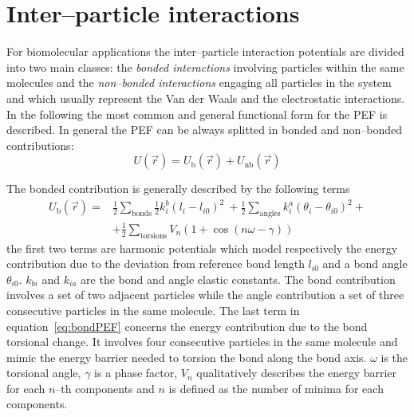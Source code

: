\section{Inter--particle interactions}
For biomolecular applications the inter--particle interaction potentials are divided into two main classes: the
\textit{bonded interactions} involving particles within the same molecules and the \textit{non--bonded
interactions} engaging all particles in the system and which usually represent the Van der Waals and the
electrostatic interactions. In the following the most common and general functional form for the \ac{PEF} is
described. In general the \ac{PEF} can be always splitted in bonded and non--bonded contributions:
\begin{equation*}
	U(\vec r) = U_{\text{b}}(\vec r) + U_\text{nb}(\vec r)
	\label{eq:FFPEF}
\end{equation*}

The bonded contribution is generally described by the following terms
\begin{equation}
	\begin{aligned}
	U_{\text{b}}(\vec r) = &\frac{1}{2}\sum_{\text{bonds}} \frac{1}{2}k_i^b(l_i - l_{i0})^2\ + \frac{1}{2}\sum_{\text{angles}} k_i^a (\theta_i - \theta_{i0})^2 +\\
		 	& +\frac{1}{2}\sum_{\text{torsions}} V_n(1+\cos (n\omega - \gamma))
	\end{aligned}
	\label{eq:bondPEF}
\end{equation}
the first two terms are harmonic potentials which model respectively the energy contribution due to the deviation
from reference bond length $l_{i0}$ and a bond angle $\theta_{i0}$. $k_{bi}$ and $k_{ia}$ are the bond and angle
elastic constants. The bond contribution involves a set of two adjacent particles while the angle contribution a 
set of three consecutive particles in the same molecule. The last term in equation~\eqref{eq:bondPEF} concerns 
the energy contribution due to the bond torsional change. It involves four consecutive particles in the same 
molecule and mimic the energy barrier needed to torsion the bond along the bond axis. $\omega$ is the torsional 
angle, $\gamma$ is a phase factor, $V_n$ qualitatively describes the energy barrier for each $n$--th components 
and $n$ is defined as the number of minima for each components.

